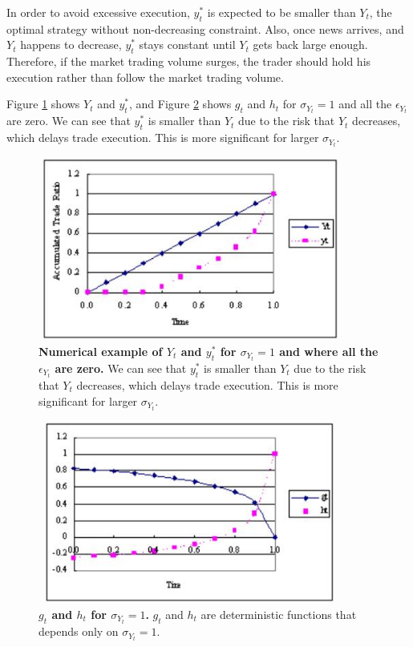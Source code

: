 In order to avoid excessive execution, $y_t^*$ is expected to be smaller than $Y_t$, 
the optimal strategy without non-decreasing constraint.  Also, once news arrives, 
and $Y_t$ happens to decrease, $y_t^*$ stays constant until $Y_t$ gets back 
large enough.  Therefore, if the market trading volume surges, the trader should 
hold his execution rather than follow the market trading volume.

Figure \ref{fg_d1} shows $Y_t$ and $y_t^*$, and Figure \ref{fg_d2} shows $g_t$ 
and $h_t$ for $\sigma_{Y_t}=1$ and all the $\epsilon_{Y_t}$ are zero.  We can 
see that $y_t^*$ is smaller than $Y_t$ due to the risk that $Y_t$ decreases, 
which delays trade execution.  This is more significant for larger 
$\sigma_{Y_t}$.

\begin{figure}[htbp]
\begin{center}
 \includegraphics[width=10cm,height=6cm]{fg_d1n.png}
\end{center}
\caption[Numerical example of $Y_t$ and $y_t^*$]{{\bf Numerical example of $Y_t$ 
and $y_t^*$ for $\sigma_{Y_t}=1$ and
where all the $\epsilon_{Y_t}$ are zero.}
 \quad We can see that $y_t^*$ is smaller than $Y_t$ due to the risk that $Y_t$ 
decreases, which delays trade
execution.
 This is more significant for larger $\sigma_{Y_t}$.}\label{fg_d1}
\end{figure}

\begin{figure}[htbp]
\begin{center}
  \includegraphics[width=10cm,height=6cm]{fg_d2n.png}
\end{center}
\caption[$g_t$ and $h_t$ for $\sigma_{Y_t}=1$.]{{\bf $g_t$ and $h_t$ for 
$\sigma_{Y_t}=1$.}
 \quad $g_t$ and $h_t$ are deterministic functions that depends only on 
$\sigma_{Y_t}=1$.}\label{fg_d2}
\end{figure}


